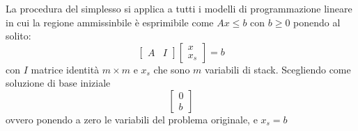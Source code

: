 \documentclass[a4paper,12pt, oneside]{book}
\begin{document}
La procedura del simplesso si applica a tutti i modelli di
programmazione lineare in cui la regione ammissinbile è esprimibile
come $Ax\leq b$ con $b\geq 0$ ponendo al solito:
\[\left[
    \begin{matrix}
      A & I
    \end{matrix}
  \right]\left[
    \begin{matrix}
      x\\
      x_s
    \end{matrix}
  \right]=b
\]
con $I$ matrice identità $m\times m$ e $x_s$ che sono $m$ variabili di
stack. Scegliendo come soluzione di base iniziale
\[\left[
    \begin{matrix}
      0\\
      b
    \end{matrix}
  \right]
\]
ovvero ponendo a zero le variabili del problema originale, e $x_s=b$
\end{document}
